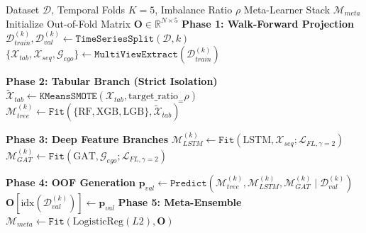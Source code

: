 \documentclass[10pt,a4paper,twocolumn]{article}
\begin{document}
\begin{algorithm}[H]
\caption{Temporal Walk-Forward Multi-View Training}
\label{alg:train}
\algrenewcommand{}
\algrenewcommand{}
\footnotesize
\begin{algorithmic}[1]
\Require Dataset $\mathcal{D}$, Temporal Folds $K=5$, Imbalance Ratio $\rho$
\Ensure Meta-Learner Stack $\mathcal{M}_{meta}$
\State Initialize Out-of-Fold Matrix $\mathbf{O} \in \mathbb{R}^{N \times 5}$
    \State \textbf{Phase 1: Walk-Forward Projection}
    \State $\mathcal{D}_{train}^{(k)}, \mathcal{D}_{val}^{(k)} \gets \mathtt{TimeSeriesSplit}(\mathcal{D}, k)$
    \State $\{\mathcal{X}_{tab}, \mathcal{X}_{seq}, \mathcal{G}_{ego}\} \gets \mathtt{MultiViewExtract}(\mathcal{D}_{train}^{(k)})$
    
    \State \textbf{Phase 2: Tabular Branch (Strict Isolation)}
    \State $\tilde{\mathcal{X}}_{tab} \gets \mathtt{KMeansSMOTE}(\mathcal{X}_{tab}, \text{target\_ratio}_{=}\rho)$
    \State $\mathcal{M}_{tree}^{(k)} \gets \mathtt{Fit}(\{\text{RF}, \text{XGB}, \text{LGB}\}, \tilde{\mathcal{X}}_{tab})$
    
    \State \textbf{Phase 3: Deep Feature Branches}
    \State $\mathcal{M}_{LSTM}^{(k)} \gets \mathtt{Fit}(\text{LSTM}, \mathcal{X}_{seq}; \mathcal{L}_{FL, \gamma=2})$
    \State $\mathcal{M}_{GAT}^{(k)} \gets \mathtt{Fit}(\text{GAT}, \mathcal{G}_{ego}; \mathcal{L}_{FL, \gamma=2})$
    
    \State \textbf{Phase 4: OOF Generation}
    \State $\mathbf{p}_{val} \gets \mathtt{Predict}(\mathcal{M}_{tree}^{(k)}, \mathcal{M}_{LSTM}^{(k)}, \mathcal{M}_{GAT}^{(k)} \mid \mathcal{D}_{val}^{(k)})$
    \State $\mathbf{O}[\text{idx}(\mathcal{D}_{val}^{(k)})] \gets \mathbf{p}_{val}$
\EndFor
\State \textbf{Phase 5: Meta-Ensemble}
\State $\mathcal{M}_{meta} \gets \mathtt{Fit}(\text{LogisticReg}(L2), \mathbf{O})$
\end{algorithmic}
\end{algorithm}
\end{document}
